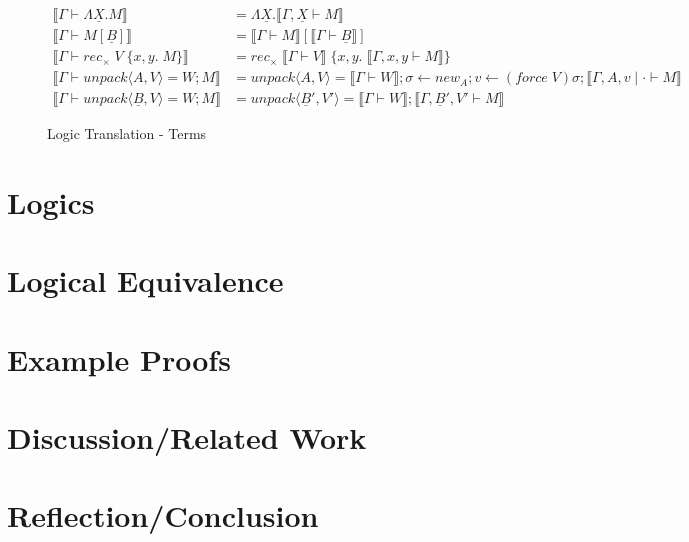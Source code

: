 \documentclass[acmsmall]{acmart}
\newcommand{\den}[1]{\llbracket #1\rrbracket}
\begin{document}
\begin{figure}[H]
\begin{align*}
  \den{\Gamma \vdash \Lambda \underline{X}.M} &= \Lambda \underline{X}. \den{\Gamma , \underline{X} \vdash M} \\
  \den{\Gamma \vdash M[\underline{B}]} &= \den{\Gamma \vdash M}[\den{\Gamma \vdash \underline{B}}] \\
  \den{\Gamma \vdash rec_\times \;V \;\{x,y.\;M\}} &= rec_\times \;\den{\Gamma \vdash V}\;\{x,y.\; \den{\Gamma, x,y \vdash M}\} \\
  \den{\Gamma \vdash unpack\langle A,V\rangle = W; M} &= unpack\langle A,V\rangle= \den{\Gamma \vdash W}; \sigma \leftarrow new_A; v \leftarrow (force\;V)\sigma; \den{\Gamma,A,v\;|\; \cdot \vdash M} \\
  \den{\Gamma \vdash unpack\langle \underline{B}, V\rangle = W; M} &= unpack\langle \underline{B}',V'\rangle=\den{\Gamma \vdash W}; \den{\Gamma,\underline{B}',V' \vdash M}
  \end{align*}
  \caption{Logic Translation - Terms}
  \end{figure}

  


\section{Logics}\label{sec:Logics}



\section{Logical Equivalence}\label{sec:LogicEquiv}

\section{Example Proofs}\label{sec:ExampleProofs}

\section{Discussion/Related Work}

\section{Reflection/Conclusion}







\end{document}
